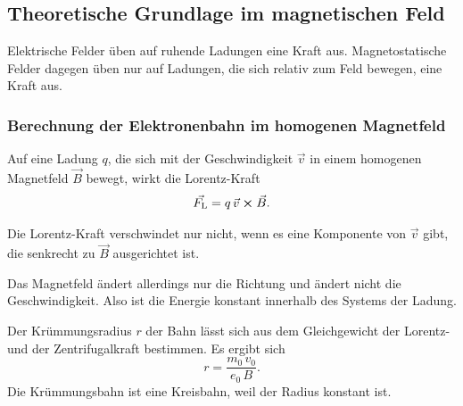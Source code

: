 \subsection{Theoretische Grundlage im magnetischen Feld}
Elektrische Felder üben auf ruhende Ladungen 
eine Kraft aus. Magnetostatische Felder dagegen üben nur auf 
Ladungen, die sich relativ zum Feld bewegen, eine Kraft aus.

\subsubsection{Berechnung der Elektronenbahn im homogenen Magnetfeld}
Auf eine Ladung $q$, die sich mit der Geschwindigkeit $\vec{v}$ in 
einem homogenen Magnetfeld $\vec{B}$ bewegt, wirkt die Lorentz-Kraft 
\begin{equation}
    \vec{F_\text{L}}= q \, \vec{v} \cross \vec{B}.
    \label{eqn:Lorentz}
\end{equation}

\noindent Die Lorentz-Kraft verschwindet nur nicht, wenn es eine
Komponente von $\vec{v}$ gibt, die senkrecht zu
$\vec{B}$ ausgerichtet ist.

\noindent Das Magnetfeld ändert allerdings nur die Richtung und ändert 
nicht die Geschwindigkeit. Also ist die Energie konstant 
innerhalb des Systems der Ladung.

\noindent Der Krümmungsradius $r$ der Bahn lässt sich aus dem Gleichgewicht der 
Lorentz- und der Zentrifugalkraft bestimmen. Es ergibt sich 
\begin{equation}
    r= \frac{m_\text{0} \, v_\text{0}}{e_\text{0} \, B}.
    \label{eqn:radius}
\end{equation}
Die Krümmungsbahn ist eine Kreisbahn, weil der Radius
konstant ist.

